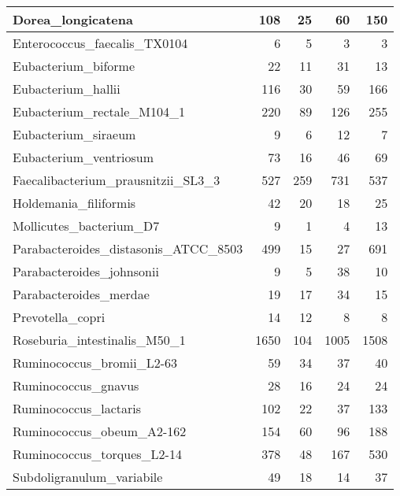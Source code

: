 \documentclass[12pt,a4paper]{article}
\begin{document}
\begin{table}[ht]
\begin{center}
\begin{tabular}{|l*{4}{|r}|}
Dorea\_longicatena & 108 & 25 & 60 & 150 \\ \hline
Enterococcus\_faecalis\_TX0104 & 6 & 5 & 3 & 3 \\ \hline
Eubacterium\_biforme & 22 & 11 & 31 & 13 \\ \hline
Eubacterium\_hallii & 116 & 30 & 59 & 166 \\ \hline
Eubacterium\_rectale\_M104\_1 & 220 & 89 & 126 & 255 \\ \hline
Eubacterium\_siraeum & 9 & 6 & 12 & 7 \\ \hline
Eubacterium\_ventriosum & 73 & 16 & 46 & 69 \\ \hline
Faecalibacterium\_prausnitzii\_SL3\_3 & 527 & 259 & 731 & 537 \\ \hline
Holdemania\_filiformis & 42 & 20 & 18 & 25 \\ \hline
Mollicutes\_bacterium\_D7 & 9 & 1 & 4 & 13 \\ \hline
Parabacteroides\_distasonis\_ATCC\_8503 & 499 & 15 & 27 & 691 \\ \hline
Parabacteroides\_johnsonii & 9 & 5 & 38 & 10 \\ \hline
Parabacteroides\_merdae & 19 & 17 & 34 & 15 \\ \hline
Prevotella\_copri & 14 & 12 & 8 & 8 \\ \hline
Roseburia\_intestinalis\_M50\_1 & 1650 & 104 & 1005 & 1508 \\ \hline
Ruminococcus\_bromii\_L2-63 & 59 & 34 & 37 & 40 \\ \hline
Ruminococcus\_gnavus & 28 & 16 & 24 & 24 \\ \hline
Ruminococcus\_lactaris & 102 & 22 & 37 & 133 \\ \hline
Ruminococcus\_obeum\_A2-162 & 154 & 60 & 96 & 188 \\ \hline
Ruminococcus\_torques\_L2-14 & 378 & 48 & 167 & 530 \\ \hline
Subdoligranulum\_variabile & 49 & 18 & 14 & 37 \\ \hline
\end{tabular}
\end{center}
\end{table}
\end{document}

